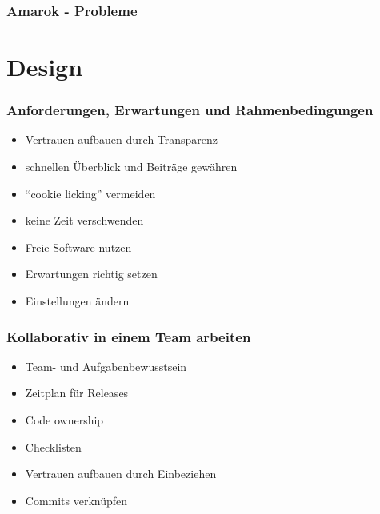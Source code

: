 \documentclass{beamer}
\begin{document}
\begin{frame}
\frametitle{Amarok - Probleme}
\begin{center}
\end{center}
\end{frame}

\section{Design}

\begin{frame}
\frametitle{Anforderungen, Erwartungen und Rahmenbedingungen}
\begin{itemize}
 \item Vertrauen aufbauen durch Transparenz
 \item schnellen \"Uberblick und Beitr\"age gew\"ahren
 \item ``cookie licking'' vermeiden
 \item keine Zeit verschwenden
 \item Freie Software nutzen
 \item Erwartungen richtig setzen
 \item Einstellungen \"andern
\end{itemize}
\end{frame}

\begin{frame}
\frametitle{Kollaborativ in einem Team arbeiten}
\begin{itemize}
 \item Team- und Aufgabenbewusstsein
 \item Zeitplan f\"ur Releases
 \item Code ownership
 \item Checklisten
 \item Vertrauen aufbauen durch Einbeziehen
 \item Commits verkn\"upfen
\end{itemize}
\end{frame}
\end{document}
